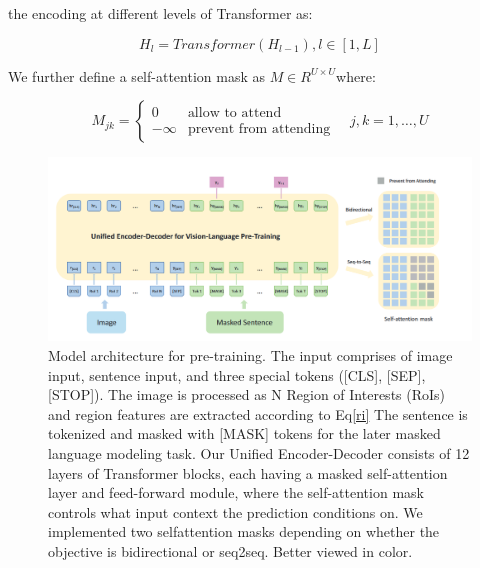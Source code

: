 \documentclass{article}
\begin{document}
\begin{sloppypar}
      the encoding at different levels of Transformer as:

      \begin{equation}
            H_l = Transformer(H_{l - 1}),l \in [1,L]
            \label{recur}
      \end{equation}


      We further define a self-attention mask as $M \in R^{U \times U}$where:

      \begin{equation}
            M_{jk} =
            \begin{cases}
                  0       & \text{allow to attend}        \\
                  -\infty & \text{prevent from attending}
            \end{cases}
            \quad j,k=1, \ldots, U
            \label{masked}
      \end{equation}

      \newpage

      \begin{figure}[h]
            \includegraphics[scale=0.5]{image}
            \caption{Model architecture for pre-training. The input comprises of image input, sentence input, and three special tokens ([CLS], [SEP], [STOP]). The image is processed as N Region of Interests (RoIs) and region features are extracted according to Eq\ref{ri} The sentence is tokenized and masked with [MASK] tokens for the later masked language modeling task. Our Unified Encoder-Decoder consists of 12 layers of Transformer blocks, each having a masked self-attention layer and feed-forward module, where the self-attention mask controls what input context the prediction conditions on. We implemented two selfattention masks depending on whether the objective is bidirectional or seq2seq. Better viewed in color.}
            \label{procedure}
      \end{figure}


\end{sloppypar}
\end{document}

